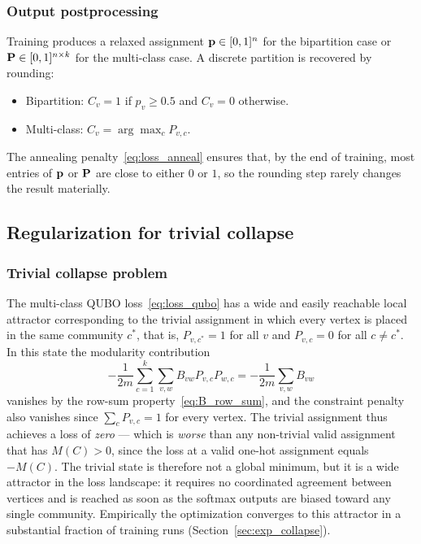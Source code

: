 \subsubsection{Output postprocessing}
\label{sec:method_postprocessing}

Training produces a relaxed assignment $\mathbf{p} \in [0,1]^n$ for the
bipartition case or $\mathbf{P} \in [0,1]^{n \times k}$ for the multi-class
case. A discrete partition is recovered by rounding:
\begin{itemize}
    \item Bipartition: $C_v = 1$ if $p_v \geq 0.5$ and $C_v = 0$
    otherwise.
    \item Multi-class: $C_v = \arg\max_c P_{v,c}$.
\end{itemize}
The annealing penalty~\eqref{eq:loss_anneal} ensures that, by the
end of training, most entries of $\mathbf{p}$ or $\mathbf{P}$ are close to either
$0$ or $1$, so the rounding step rarely changes the result
materially.

\subsection{Regularization for trivial collapse}
\label{sec:method_regularization}

\subsubsection{Trivial collapse problem}
\label{sec:method_collapse_problem}

The multi-class QUBO loss~\eqref{eq:loss_qubo} has a wide and
easily reachable local attractor corresponding to the trivial
assignment in which every vertex is placed in the same community
$c^*$, that is, $P_{v,c^*} = 1$ for all $v$ and $P_{v,c} = 0$ for
all $c \neq c^*$. In this state the modularity contribution
\begin{equation*}
    -\frac{1}{2m} \sum_{c=1}^{k} \sum_{v,w} B_{vw} P_{v,c} P_{w,c}
    = -\frac{1}{2m} \sum_{v,w} B_{vw}
\end{equation*}
vanishes by the row-sum property~\eqref{eq:B_row_sum}, and the
constraint penalty also vanishes since $\sum_c P_{v,c} = 1$ for
every vertex. The trivial assignment thus achieves a loss of
\emph{zero} --- which is \emph{worse} than any non-trivial valid
assignment that has $M(C) > 0$, since the loss at a valid
one-hot assignment equals $-M(C)$. The trivial state is therefore
not a global minimum, but it is a wide attractor in the loss
landscape: it requires no coordinated agreement between vertices
and is reached as soon as the softmax outputs are biased toward
any single community. Empirically the optimization converges to
this attractor in a substantial fraction of training runs
(Section~\ref{sec:exp_collapse}).



